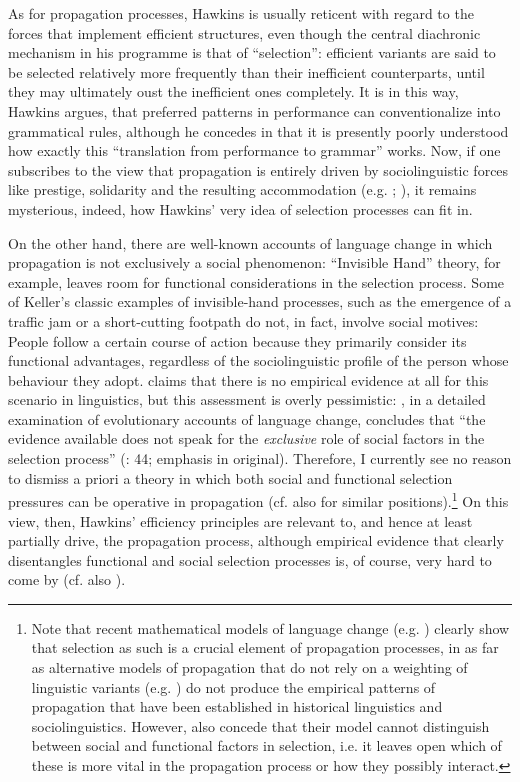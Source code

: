 \documentclass[output=paper]{langsci/langscibook}
\begin{document}
As for propagation processes, Hawkins is usually reticent with regard to the forces that implement efficient structures, even though the central diachronic mechanism in his programme is that of “selection”: efficient variants are said to be selected relatively more frequently than their inefficient counterparts, until they may ultimately oust the inefficient ones completely. It is in this way, Hawkins argues, that preferred patterns in performance can conventionalize into grammatical rules, although he concedes in \citet[10]{Hawkins2014} that it is presently poorly understood how exactly this “translation from performance to grammar” works. Now, if one subscribes to the view that propagation is entirely driven by sociolinguistic forces like prestige, solidarity and the resulting accommodation (e.g. \citealt{Croft2000,Cristofaro2017}; ), it remains mysterious, indeed, how Hawkins’ very idea of selection processes can fit in. 

On the other hand, there are well-known accounts of language change in which propagation is not exclusively a social phenomenon:  “Invisible Hand” theory, for example, leaves room for functional considerations in the selection process. Some of Keller’s classic examples of invisible-hand processes, such as the emergence of a traffic jam or a short-cutting footpath do not, in fact, involve social motives: People follow a certain course of action because they primarily consider its functional advantages, regardless of the sociolinguistic profile of the person whose behaviour they adopt. \citet{Cristofaro2017} claims that there is no empirical evidence at all for this scenario in linguistics, but this assessment is overly pessimistic: \citet{Rosenbach2008}, in a detailed examination of evolutionary accounts of language change, concludes that “the evidence available does not speak for the \textit{exclusive} role of social factors in the selection process” (\citealt{Rosenbach2008}: 44; emphasis in original). Therefore, I currently see no reason to dismiss a priori a theory in which both social and functional selection pressures can be operative in propagation (cf. also \citealt{Haspelmath1999,Nettle1999,Enfield2014} for similar positions).\footnote{Note that recent mathematical models of language change (e.g. \citealt{BlytheCroft2012}) clearly show that selection as such is a crucial element of propagation processes, in as far as alternative models of propagation that do not rely on a weighting of linguistic variants (e.g. \citealt{Trudgill2004}) do not produce the empirical patterns of propagation that have been established in historical linguistics and sociolinguistics. However, \citet{BlytheCroft2012} also concede that their model cannot distinguish between social and functional factors in selection, i.e. it leaves open which of these is more vital in the propagation process or how they possibly interact.} On this view, then, Hawkins’ efficiency principles are relevant to, and hence at least partially drive, the propagation process, although empirical evidence that clearly disentangles functional and social selection processes is, of course, very hard to come by (cf. also \citealt{Seiler2006}). 
\end{document}

